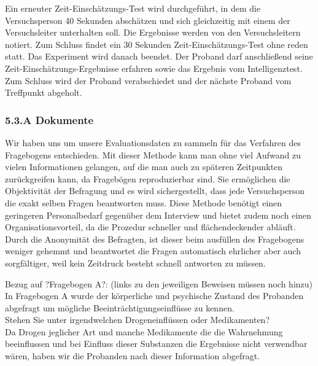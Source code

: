 \documentclass{Bericht}
\begin{document}
Ein erneuter Zeit-Einschätzungs-Test wird durchgeführt, in dem die Versuchsperson 40 Sekunden abschätzen und sich gleichzeitig mit einem der Versuchsleiter unterhalten soll. Die Ergebnisse werden von den Versuchsleitern notiert. Zum Schluss findet ein 30 Sekunden Zeit-Einschätzungs-Test ohne reden statt. Das Experiment wird danach beendet. Der Proband darf anschließend seine Zeit-Einschätzungs-Ergebnisse erfahren sowie das Ergebnis vom Intelligenztest. Zum Schluss wird der Proband verabschiedet und der nächste Proband vom Treffpunkt abgeholt.

\subsubsection{5.3.A Dokumente}

Wir haben uns um unsere Evaluationsdaten zu sammeln für das Verfahren des Fragebogens entschieden. Mit dieser Methode kann man ohne viel Aufwand zu vielen Informationen gelangen, auf die man auch zu späteren Zeitpunkten zurückgreifen kann, da Fragebögen reproduzierbar sind. Sie ermöglichen die Objektivität der Befragung und es wird sichergestellt, dass jede Versuchsperson die exakt selben Fragen beantworten muss. Diese Methode benötigt einen geringeren Personalbedarf gegenüber dem Interview und bietet zudem noch einen Organisationsvorteil, da die Prozedur schneller und flächendeckender abläuft. Durch die Anonymität des Befragten, ist dieser beim ausfüllen des Fragebogens weniger gehemmt und beantwortet die Fragen automatisch ehrlicher aber auch sorgfältiger, weil kein Zeitdruck besteht schnell antworten zu müssen.

\par

Bezug auf ?Fragebogen A?: (links zu den jeweiligen Beweisen müssen noch hinzu) \\

In Fragebogen A wurde der körperliche und psychische Zustand des Probanden abgefragt um mögliche Beeinträchtigungseinflüsse zu kennen. \\

Stehen Sie unter irgendwelchen Drogeneinflüssen oder Medikamenten? \\

Da Drogen jeglicher Art und manche Medikamente die die Wahrnehmung beeinflussen und bei Einfluss dieser Substanzen die Ergebnisse nicht verwendbar wären, haben wir die Probanden nach dieser Information abgefragt. \\
\end{document}
